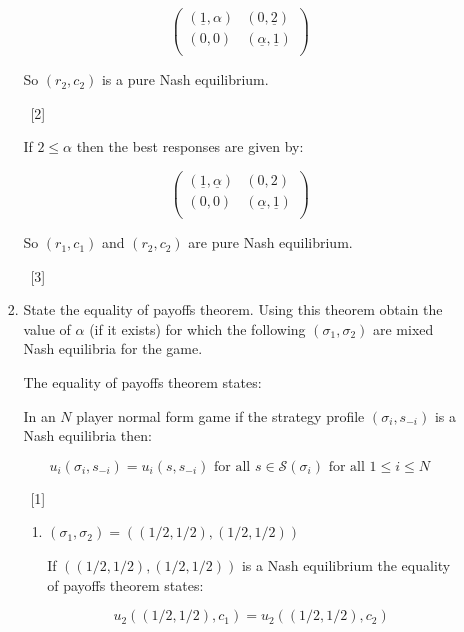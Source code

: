 \documentclass[12pt,a4paper]{article}
\begin{document}
\begin{enumerate}
\begin{enumerate}
\begin{enumerate}
                    \[\begin{pmatrix}
                        (\underline{1},\alpha) & (0,\underline{2})\\
                        (0,0) & (\underline{\alpha},\underline{1})\\
                    \end{pmatrix}\]

                So \((r_2, c_2)\) is a pure Nash equilibrium.

            ~\hfill{[2]}

                If \(2\leq\alpha\) then the best responses are given by:

                    \[\begin{pmatrix}
                        (\underline{1},\underline{\alpha}) & (0,2)\\
                        (0,0) & (\underline{\alpha},\underline{1})\\
                    \end{pmatrix}\]

                So \((r_1, c_1)\) and \((r_2, c_2)\) are pure Nash equilibrium.

            ~\hfill{[3]}

            \item State the equality of payoffs theorem. Using this theorem
                obtain the value of \(\alpha\) (if it exists) for which the
                following \((\sigma_1, \sigma_2)\) are mixed Nash equilibria for the game.

            The equality of payoffs theorem states:

            In an $N$ player normal form game if the strategy profile $(\sigma_i,s_{-i})$ is a Nash equilibria then:

            $$u_{i}(\sigma_i,s_{-i})=u_{i}(s,s_{-i})\text{ for all }s\in\mathcal{S}(\sigma_i)\text{ for all }1\leq i\leq N$$

            ~\hfill{[1]}

                \begin{enumerate}
                    \item \((\sigma_1, \sigma_2) = ((1/2,1/2), (1/2,1/2))\)

                    If \(((1/2,1/2), (1/2,1/2))\) is a Nash equilibrium the
                    equality of payoffs theorem states:

                    \[u_2((1/2,1/2),c_1)=u_2((1/2,1/2),c_2)\]


\end{enumerate}
\end{enumerate}
\end{enumerate}
\end{enumerate}
\end{document}
